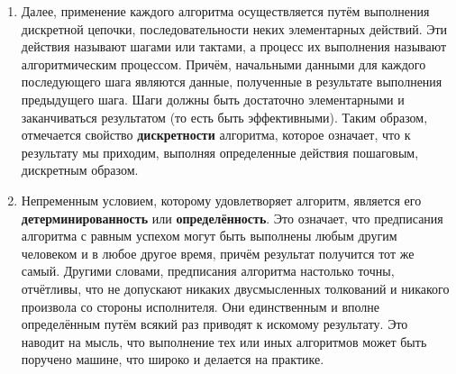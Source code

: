 \documentclass[a4paper,12pt]{article}
\begin{document}
\begin{enumerate}
    Пусть натуральные (целые положительные) числа будут допустимыми начальными данными для этого алгоритма. Для числа 6 алгоритмический процесс будет проходить так:
    Первый шаг: \(6 \cdot 2 = 12\); переходим к п. 2; \\
    Второй шаг: \(12 + 1 = 13\); переходим к п. 3; \\
    Третий шаг: \(y = 1\), переходим к п. 4; \\
    Четвёртый шаг: \(6 : 1 = 6\). Конец.

    Искомый результат равен 6. Иначе будет протекать алгоритмический процесс для исходного данного 7:
    Первый шаг: \(7 \cdot 2 = 14\); переходим к п. 2; \\
    Второй шаг: \(14 + 1 = 15\); переходим к п. 3; \\
    Третий шаг: \(y = 0\); переходим к п. 4; \\
    Четвёртый шаг: \(7:0\) --- деление невозможно. Процесс зашёл в тупик, натолкнулся на препятствие и безрезультатно оборвался.

    Наконец отметим ещё одно немаловажное качество начальных данных для алгоритма. Они должны быть конструктивными. Конструктивность объекта означает, что он весь целиком может быть представлен для его рассмотрения и работы с ним. Примеры: булевы функции; формулы алгебры высказываний; натуральные числа; рациональные числа; матрицы с натуральными и рациональными элементами; многочлены с рациональными коэффициентами. Неконструктивные объекты: действительные числа, представимые бесконечными непериодическими дробями \(0,\alpha_1\alpha_2\alpha_3\dots\), в частности числа \(\pi\) и \(e\).

    \item Далее, применение каждого алгоритма осуществляется путём выполнения дискретной цепочки, последовательности неких элементарных действий. Эти действия называют шагами или тактами, а процесс их выполнения называют алгоритмическим процессом. Причём, начальными данными для каждого последующего шага являются данные, полученные в результате выполнения предыдущего шага. Шаги должны быть достаточно элементарными и заканчиваться результатом (то есть быть эффективными). Таким образом, отмечается свойство \textbf{дискретности} алгоритма, которое означает, что к результату мы приходим, выполняя определенные действия пошаговым, дискретным образом.

    \item Непременным условием, которому удовлетворяет алгоритм, является его \textbf{детерминированность} или \textbf{определённость}. Это означает, что предписания алгоритма с равным успехом могут быть выполнены любым другим человеком и в любое другое время, причём результат получится тот же самый. Другими словами, предписания алгоритма настолько точны, отчётливы, что не допускают никаких двусмысленных толкований и никакого произвола со стороны исполнителя. Они единственным и вполне определённым путём всякий раз приводят к искомому результату. Это наводит на мысль, что выполнение тех или иных алгоритмов может быть поручено машине, что широко и делается на практике.


\end{enumerate}
\end{document}
